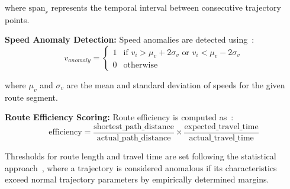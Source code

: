 \documentclass[runningheads]{llncs}
\begin{document}
\begin{description}
    where $\text{span}_r$ represents the temporal interval between consecutive trajectory points.

    \textbf{Speed Anomaly Detection:} Speed anomalies are detected using~\cite{wangDetectingAnomalousTrajectories2018}:
    \begin{equation}
    v_{anomaly} = \begin{cases} 
    1 & \text{if } v_i > \mu_v + 2\sigma_v \text{ or } v_i < \mu_v - 2\sigma_v \\
    0 & \text{otherwise}
    \end{cases}
    \label{eq:speed-anomaly}
    \end{equation}

    where $\mu_v$ and $\sigma_v$ are the mean and standard deviation of speeds for the given route segment.

    \textbf{Route Efficiency Scoring:} Route efficiency is computed as~\cite{chenTemporalContextAwareRoute2021}:
    \begin{equation}
    \text{efficiency} = \frac{\text{shortest\_path\_distance}}{\text{actual\_path\_distance}} \times \frac{\text{expected\_travel\_time}}{\text{actual\_travel\_time}}
    \label{eq:efficiency}
    \end{equation}

    Thresholds for route length and travel time are set following the statistical approach~\cite{wangStatisticalFrameworkTaxi2020,wangDetectingAnomalousTrajectories2018}, where a trajectory is considered anomalous if its characteristics exceed normal trajectory parameters by empirically determined margins. 


\end{description}
\end{document}
